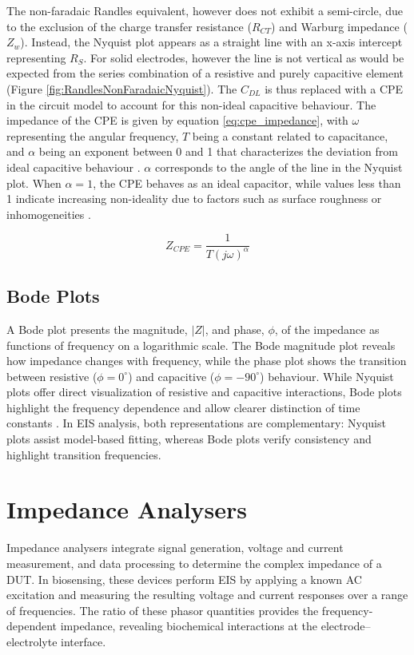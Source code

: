 The non-faradaic Randles equivalent, however does not exhibit a semi-circle, due to the exclusion of the charge transfer resistance ($R_{CT}$) and Warburg impedance ($Z_w$). Instead, the Nyquist plot appears as a straight line with an x-axis intercept representing $R_S$. For solid electrodes, however the line is not vertical as would be expected from the series combination of a resistive and purely capacitive element \cite{xieReviewAdvancementsNanoscale2020a} (Figure \ref{fig:RandlesNonFaradaicNyquist}). The $C_{DL}$ is thus replaced with a \ac{CPE} in the circuit model to account for this non-ideal capacitive behaviour. The impedance of the \ac{CPE} is given by equation \ref{eq:cpe_impedance}, with $\omega$ representing the angular frequency, $T$ being a constant related to capacitance, and $\alpha$ being an exponent between 0 and 1 that characterizes the deviation from ideal capacitive behaviour \cite{xieReviewAdvancementsNanoscale2020a}. $\alpha$ corresponds to the angle of the line in the Nyquist plot. When $\alpha = 1$, the \ac{CPE} behaves as an ideal capacitor, while values less than 1 indicate increasing non-ideality due to factors such as surface roughness or inhomogeneities \cite{xieReviewAdvancementsNanoscale2020a}.

\begin{equation}
    Z_{CPE} = \frac{1}{T(j\omega)^{\alpha}}
    \label{eq:cpe_impedance}
\end{equation}

\subsection{Bode Plots}

A Bode plot presents the magnitude, $|Z|$, and phase, $\phi$, of the impedance as functions of frequency on a logarithmic scale. The Bode magnitude plot reveals how impedance changes with frequency, while the phase plot shows the transition between resistive ($\phi = 0^\circ$) and capacitive ($\phi = -90^\circ$) behaviour. While Nyquist plots offer direct visualization of resistive and capacitive interactions, Bode plots highlight the frequency dependence and allow clearer distinction of time constants \cite{BodeNyquistPlot}. In EIS analysis, both representations are complementary: Nyquist plots assist model-based fitting, whereas Bode plots verify consistency and highlight transition frequencies.

\section{Impedance Analysers}
Impedance analysers integrate signal generation, voltage and current measurement, and data processing to determine the complex impedance of a \ac{DUT}. In biosensing, these devices perform \ac{EIS} by applying a known AC excitation and measuring the resulting voltage and current responses over a range of frequencies. The ratio of these phasor quantities provides the frequency-dependent impedance, revealing biochemical interactions at the electrode–electrolyte interface.

